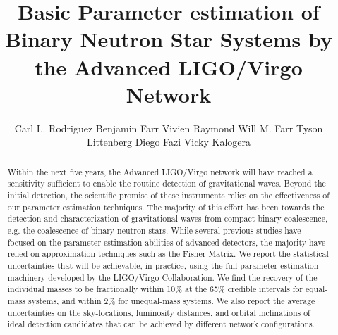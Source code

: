 \documentclass[11pt,a4paper]{emulateapj} 
\newcommand{\will}[1]{{\color{cyan} #1}}
\begin{document}
\title{Basic Parameter estimation of Binary Neutron Star Systems by
  the Advanced LIGO/Virgo Network} \author{Carl L. Rodriguez
Benjamin Farr 
Vivien Raymond  Will M. Farr 
Tyson Littenberg
Diego Fazi
Vicky Kalogera}

 



\begin{abstract}

Within the next five years, the Advanced LIGO/Virgo network will have
reached a sensitivity sufficient to enable the routine detection of
gravitational waves.  Beyond the initial detection, the scientific
promise of these instruments relies on the effectiveness of our
parameter estimation techniques. The majority of this effort has been towards the
detection and characterization of gravitational waves from compact
binary coalescence, e.g. the coalescence of binary neutron stars.
While several previous studies have focused on the parameter
estimation abilities of advanced detectors, the majority have relied
on approximation techniques such as the Fisher Matrix.  We report the
statistical uncertainties that will be achievable, in practice, using
the full parameter estimation machinery developed by the LIGO/Virgo
Collaboration.  We find the recovery of the individual masses to be
fractionally within 10\% at the 65\% credible intervals for equal-mass
systems, and within 2\% for unequal-mass systems.  We also report the
average uncertainties on the sky-locations, luminosity distances, and
orbital inclinations of ideal detection candidates that can be
achieved by different network configurations.
\end{abstract}

\maketitle
\end{document}
